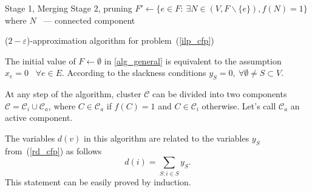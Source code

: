 \documentclass[11pt, tightenlines, twoside, onecolumn, nofloats, nobibnotes, nofootinbib, superscriptaddress, noshowpacks, centertags]{revtex4}
\begin{document}
\begin{algorithm}[H]
    \DontPrintSemicolon
    Stage 1, Merging\;
    Stage 2, pruning\;
    $F' \longleftarrow \{e\in F:~\exists N\in(V, F\backslash\{e\}),f(N)=1\}$ where $N$ ~--- connected component\;
    \caption{($2-\varepsilon$)-approximation algorithm for problem~(\ref{ilp_cfp})\label{alg_general}}
\end{algorithm}

The initial value of $F\longleftarrow \emptyset$ in \ref{alg_general} is equivalent to the assumption $x_e = 0 \;\;\; \forall e \in E$. According to the slackness conditions $y_S = 0,~\forall \emptyset\not=S\subset V$.

At any step of the algorithm, cluster $\mathcal{C}$ can be divided into two components $\mathcal{C} = \mathcal{C}_i \cup \mathcal{C}_a$, where $C\in\mathcal{C}_a$ if $f(C) = 1$ and $C\in\mathcal{C}_i$ otherwise. Let's call $\mathcal{C}_a$ an active component.

The variables $d(v)$ in this algorithm are related to the variables $y_S$ from~(\ref{rd_cfp}) as follows 
$$d(i) = \sum_{S:i\in S}y_S.$$
This statement can be easily proved by induction.
\end{document}
